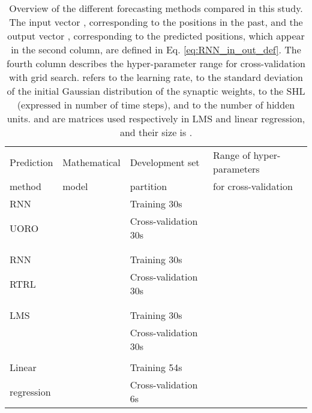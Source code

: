 \documentclass[twocolumn,a4paper]{svjour3} \sloppy          \smartqed
\begin{document}
\begin{table*}[htb!]
\normalsize
\begin{center}
\begin{tabular}{llll}
\hline
Prediction    &  Mathematical                               & Development set        & Range of hyper-parameters \\
method        &  model                                      & partition              & for cross-validation     \\
\hline
\hline
RNN           &  & Training 30s           &  \\
UORO          &                        & Cross-validation 30s   &  \\
              &                                             &                        & \\
              &                                             &                        &  \\    
\hline
RNN           &  & Training 30s           &  \\
RTRL          &                        & Cross-validation 30s   &  \\
              &                                             &                        &  \\
              &                                             &                        &  \\  
\hline
LMS           &                          & Training 30s           &  \\
              &                                             & Cross-validation 30s   & \multicolumn{1}{r}{}\\
              &                                             &                        & \\
\hline
Linear        &                            & Training 54s           &  \\
regression    &                                             & Cross-validation 6s    & \multicolumn{1}{r}{} \\
\hline
\end{tabular}
\end{center}
\caption{Overview of the different forecasting methods compared in this study. The input vector \text{\normalsize }, corresponding to the positions in the past, and the output vector \text{\normalsize }, corresponding to the predicted positions, which appear in the second column, are defined in Eq. \ref{eq:RNN_in_out_def}. The fourth column describes the hyper-parameter range for cross-validation with grid search.   refers to the learning rate,  to the standard deviation of the initial Gaussian distribution of the synaptic weights,  to the SHL (expressed in number of time steps), and  to the number of hidden units.  and  are matrices used respectively in LMS and linear regression, and their size is .}
\label{table:models comparison}
\end{table*}
\end{document}
